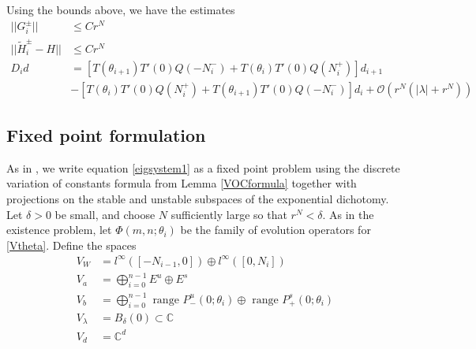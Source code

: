 \documentclass[12pt]{article}
\def\C{{\mathbb C}}
\begin{document}
Using the bounds above, we have the estimates
\begin{align*}
||G_i^\pm|| &\leq C r^N \\
||\tilde{H}_i^\pm - H|| &\leq C r^N \\
D_i d &= [ T(\theta_{i+1}) T'(0)Q(-N_i^-) + T(\theta_i) T'(0)Q(N_i^+) ] d_{i+1} \\
&- [ T(\theta_i) T'(0) Q(N_i^+) + T(\theta_{i+1}) T'(0)Q(-N_i^-) ] d_i +\mathcal{O}(r^N( |\lambda| + r^N))
\end{align*}

\subsection{Fixed point formulation}

As in \cite{Sandstede1998}, we write equation \eqref{eigsystem1} as a fixed point problem using the discrete variation of constants formula from Lemma \ref{VOCformula} together with projections on the stable and unstable subspaces of the exponential dichotomy. Let $\delta > 0$ be small, and choose $N$ sufficiently large so that $r^N < \delta$. As in the existence problem, let $\Phi(m, n; \theta_i)$ be the family of evolution operators for \eqref{Vtheta}. Define the spaces
\begin{align*}
V_W &= l^\infty([-N_{i-1}, 0]) \oplus l^\infty([0, N_i])  \\
V_a &= \bigoplus_{i=0}^{n-1} E^u \oplus E^s \\
V_b &= \bigoplus_{i=0}^{n-1} 
\text{ range } P_-^u(0; \theta_i) \oplus \text{ range } P_+^s(0; \theta_i)\\
V_\lambda &= B_\delta(0) \subset \C \\
V_d &= \C^d
\end{align*}
\end{document}
